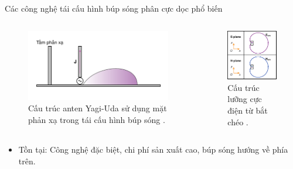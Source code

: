 \begin{frame}{Các công nghệ tái cấu hình búp sóng phân cực dọc phổ biến}
    \vspace{-6mm}
    \begin{columns}
        \begin{figure}
            \centering
            \includegraphics[width=1.0\linewidth]{Figures/Yagi.pdf}
            \caption{Cấu trúc anten Yagi-Uda sử dụng mặt phản xạ trong tái cấu hình búp sóng \cite{10818738} \cite{7001061} \cite{7636946}.}
            \label{fig:Yagi_uda}
        \end{figure}
        \begin{figure}
            \centering
            \includegraphics[width=0.75\linewidth]{Figures/MED.pdf}
            \caption{Cấu trúc lưỡng cực điện từ bắt chéo \cite{10621581} \cite{7815297} \cite{8753674} \cite{8421283} \cite{9789208}.}
            \label{fig:MED}
        \end{figure}
    \end{columns}
    \begin{itemize}
        \item Tồn tại: Công nghệ đặc biệt, chi phí sản xuất cao, búp sóng hướng về phía trên.
    \end{itemize}
\end{frame}

